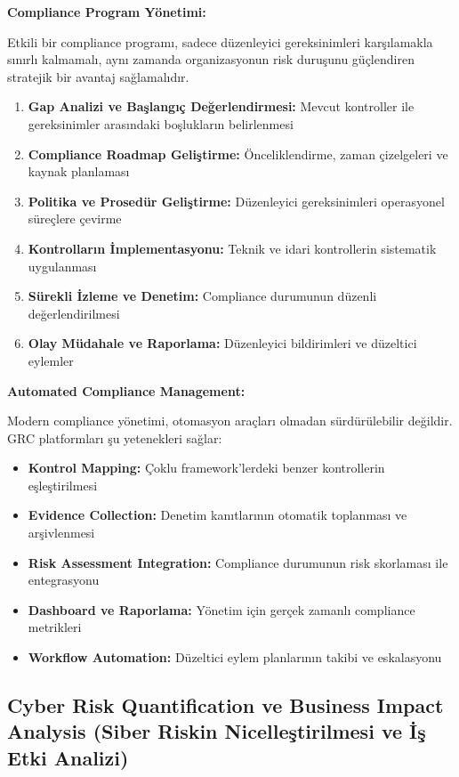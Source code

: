 \textbf{Compliance Program Yönetimi:}

Etkili bir compliance programı, sadece düzenleyici gereksinimleri karşılamakla sınırlı kalmamalı, aynı zamanda organizasyonun risk duruşunu güçlendiren stratejik bir avantaj sağlamalıdır.

\begin{enumerate}
    \item \textbf{Gap Analizi ve Başlangıç Değerlendirmesi:} Mevcut kontroller ile gereksinimler arasındaki boşlukların belirlenmesi
    \item \textbf{Compliance Roadmap Geliştirme:} Önceliklendirme, zaman çizelgeleri ve kaynak planlaması
    \item \textbf{Politika ve Prosedür Geliştirme:} Düzenleyici gereksinimleri operasyonel süreçlere çevirme
    \item \textbf{Kontrolların İmplementasyonu:} Teknik ve idari kontrollerin sistematik uygulanması
    \item \textbf{Sürekli İzleme ve Denetim:} Compliance durumunun düzenli değerlendirilmesi
    \item \textbf{Olay Müdahale ve Raporlama:} Düzenleyici bildirimleri ve düzeltici eylemler
\end{enumerate}

\textbf{Automated Compliance Management:}

Modern compliance yönetimi, otomasyon araçları olmadan sürdürülebilir değildir. GRC platformları şu yetenekleri sağlar:

\begin{itemize}
    \item \textbf{Kontrol Mapping:} Çoklu framework'lerdeki benzer kontrollerin eşleştirilmesi
    \item \textbf{Evidence Collection:} Denetim kanıtlarının otomatik toplanması ve arşivlenmesi
    \item \textbf{Risk Assessment Integration:} Compliance durumunun risk skorlaması ile entegrasyonu
    \item \textbf{Dashboard ve Raporlama:} Yönetim için gerçek zamanlı compliance metrikleri
    \item \textbf{Workflow Automation:} Düzeltici eylem planlarının takibi ve eskalasyonu
\end{itemize}

\subsection{Cyber Risk Quantification ve Business Impact Analysis (Siber Riskin Nicelleştirilmesi ve İş Etki Analizi)}

